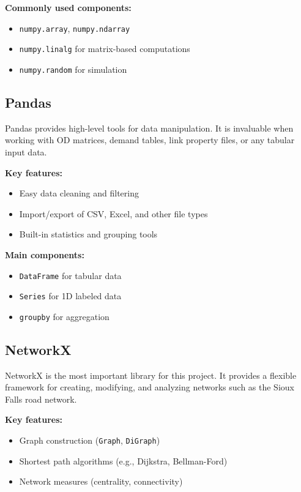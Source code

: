 \documentclass{rapportCS} %
\begin{document}
\textbf{Commonly used components:}
\begin{itemize}
    \item \texttt{numpy.array}, \texttt{numpy.ndarray}
    \item \texttt{numpy.linalg} for matrix-based computations
    \item \texttt{numpy.random} for simulation
\end{itemize}

\subsection{Pandas}
Pandas provides high-level tools for data manipulation. It is invaluable when working with OD matrices, demand tables, link property files, or any tabular input data.

\textbf{Key features:}
\begin{itemize}
    \item Easy data cleaning and filtering
    \item Import/export of CSV, Excel, and other file types
    \item Built-in statistics and grouping tools
\end{itemize}

\textbf{Main components:}
\begin{itemize}
    \item \texttt{DataFrame} for tabular data
    \item \texttt{Series} for 1D labeled data
    \item \texttt{groupby} for aggregation
\end{itemize}

\subsection{NetworkX}
NetworkX is the most important library for this project. It provides a flexible framework for creating, modifying, and analyzing networks such as the Sioux Falls road network.

\textbf{Key features:}
\begin{itemize}
    \item Graph construction (\texttt{Graph}, \texttt{DiGraph})
    \item Shortest path algorithms (e.g., Dijkstra, Bellman-Ford)
    \item Network measures (centrality, connectivity)
\end{itemize}
\end{document}
